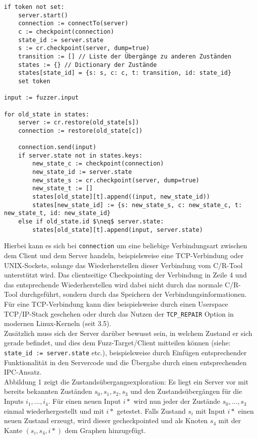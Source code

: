 \documentclass[a4paper]{article}
\begin{document}
\begin{lstlisting}[mathescape, caption=Fuzztarget zur Exploration des Zustandsgraphen]
if token not set:
    server.start()
    connection := connectTo(server)
    c := checkpoint(connection)
    state_id := server.state
    s := cr.checkpoint(server, dump=true)
    transition := [] // Liste der Übergänge zu anderen Zuständen
    states := {} // Dictionary der Zustände
    states[state_id] = {s: s, c: c, t: transition, id: state_id}
    set token

input := fuzzer.input

for old_state in states:
    server := cr.restore(old_state[s])
    connection := restore(old_state[c])

    connection.send(input)
    if server.state not in states.keys:
        new_state_c := checkpoint(connection)
        new_state_id := server.state
        new_state_s := cr.checkpoint(server, dump=true)
        new_state_t := []
        states[old_state][t].append((input, new_state_id))
        states[new_state_id] := {s: new_state_s, c: new_state_c, t: new_state_t, id: new_state_id}
    else if old_state.id $\neq$ server.state:
        states[old_state][t].append(input, server.state)
\end{lstlisting}
Hierbei kann es sich bei \texttt{connection} um eine beliebige Verbindungsart zwischen dem Client und dem Server handeln, beispielsweise eine TCP-Verbindung oder UNIX-Sockets, solange das Wiederherstellen dieser Verbindung vom C/R-Tool unterstützt wird. Das clientseitige Checkpointing der Verbindung in Zeile 4 und das entsprechende Wiederherstellen wird dabei nicht durch das normale C/R-Tool durchgeführt, sondern durch das Speichern der Verbindungsinformationen. Für eine TCP-Verbindung kann dies beispielsweise durch einen Userspace TCP/IP-Stack geschehen oder durch das Nutzen der \texttt{TCP\_REPAIR} Option in modernen Linux-Kerneln (seit 3.5).\\
Zusätzlich muss sich der Server darüber bewusst sein, in welchem Zustand er sich gerade befindet, und dies dem Fuzz-Target/Client mitteilen können (siehe: \texttt{state\_id := server.state} etc.), beispielsweise durch Einfügen entsprechender Funktionalität in den Servercode und die Übergabe durch einen entsprechenden IPC-Ansatz.\\
Abbildung 1 zeigt die Zustandsübergangsexploration: Es liegt ein Server vor mit bereits bekannten Zuständen $s_0, s_1, s_2, s_3$ und den Zustandsübergängen für die Inputs $i_1, \dots, i_4$. Für einen neuen Input $i*$ wird nun jeder der Zustände $s_0, \dots, s_3$ einmal wiederhergestellt und mit $i*$ getestet. Falls Zustand $s_i$ mit Input $i*$ einen neuen Zustand erzeugt, wird dieser gecheckpointed und als Knoten $s_4$ mit der Kante $(s_i, s_4, i*)$ dem Graphen hinzugefügt.
\end{document}
